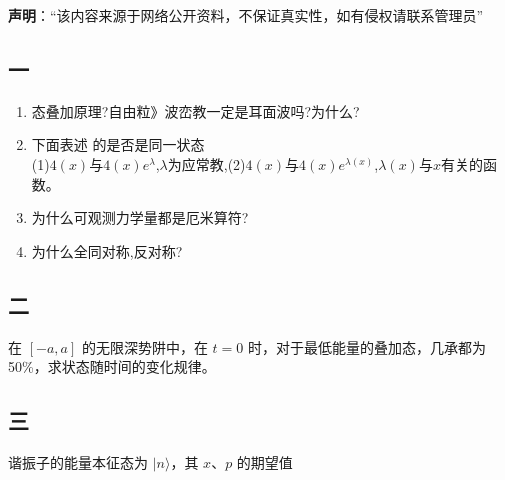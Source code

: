 
\textbf{声明}：“该内容来源于网络公开资料，不保证真实性，如有侵权请联系管理员”

\subsection{一}
\begin{enumerate}
\item 态叠加原理?自由粒》波峦教一定是耳面波吗?为什么?
\item 下面表述 的是否是同一状态\\
(1)$4(x)$与$4(x)e^\lambda$,$\lambda$为应常教,(2)$4(x)$与$4(x)e^{\lambda(x)}$,$\lambda(x)$与$x$有关的函数。
\item 为什么可观测力学量都是厄米算符?
\item 为什么全同对称,反对称?
\end{enumerate}
\subsection{二}
在 $[-a, a]$ 的无限深势阱中，在 $t=0$ 时，对于最低能量的叠加态，几承都为50\%，求状态随时间的变化规律。
\subsection{三}
谐振子的能量本征态为 $\lvert n \rangle$，其 $x$、$p$ 的期望值
